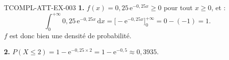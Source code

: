 \begin{corrige}{TCOMPL-ATT-EX-003}
\textbf{1.} $f(x)=0{,}25\,\mathrm{e}^{-0{,}25x} \geq 0$ pour tout $x\geq0$, et :
\[
  \int_0^{+\infty} 0{,}25\,\mathrm{e}^{-0{,}25x}\,\mathrm{d}x = \Big[-\mathrm{e}^{-0{,}25x}\Big]_0^{+\infty} = 0-(-1) = 1.
\]
$f$ est donc bien une densité de probabilité.

\textbf{2.} $P(X\leq2) = 1-\mathrm{e}^{-0{,}25\times2} = 1-\mathrm{e}^{-0{,}5} \approx 0{,}3935$.
\end{corrige}
